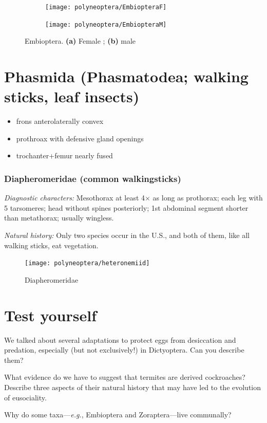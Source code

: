 \begin{figure}[ht!]
    \centering
    \begin{subfigure}[b!]{0.45\textwidth}
        \texttt{[image: polyneoptera/EmbiopteraF]}
        \caption{}
        \label{fig:embiop1}
    \end{subfigure}
    \qquad
    \begin{subfigure}[ht!]{0.4\textwidth}
        \texttt{[image: polyneoptera/EmbiopteraM]}
        \caption{}
        \label{fig:embiop2}
    \end{subfigure}
    \caption{Embioptera. \textbf{(a)} Female \citep[modified from][Plate 1, Fig. D]{bhl37580}; \textbf{(b)} male \citep[modified from][Plate 130, Fig. C]{bhl37580}}\label{fig:embiops}
\end{figure}

\section{Phasmida (Phasmatodea; walking sticks, leaf insects)}
\begin{itemize}
\item frons anterolaterally convex
\item prothroax with defensive gland openings
\item trochanter+femur nearly fused
\end{itemize}

\subsubsection{Diapheromeridae (common walkingsticks)}
\noindent{}\textit{Diagnostic characters:} Mesothorax at least 4$\times$ as long as prothorax; each leg with 5 tarsomeres; head without spines posteriorly; 1st abdominal segment shorter than metathorax; usually wingless.\vspace{3mm}

\noindent{}\textit{Natural history:} Only two species occur in the U.S., and both of them, like all walking sticks, eat vegetation.

\begin{figure}[ht!]
  \centering
    \texttt{[image: polyneoptera/heteronemiid]}
  \caption{Diapheromeridae \citep[modified from][Fig. 118]{bhlitem16801}}
  \label{fig:heteronemiid}
\end{figure}

\section*{Test yourself}
We talked about several adaptations to protect eggs from desiccation and predation, especially (but not exclusively!) in Dictyoptera. Can you describe them?\vspace{3mm}

\noindent{}What evidence do we have to suggest that termites are derived cockroaches? Describe three aspects of their natural history that may have led to the evolution of eusociality.\vspace{3mm}

\noindent{}Why do some taxa---\textit{e.g.}, Embioptera and Zoraptera---live communally?

\clearpage
\thispagestyle{empty}
